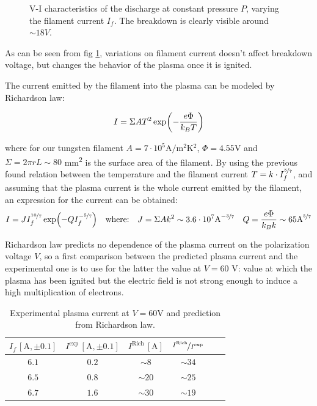 \documentclass[11pt,a4 paper]{article}
\let\oldfrac\frac
\renewcommand{\frac}[3][d]{\ifthenelse{\equal{#1}{d}}{\oldfrac{#2}{#3}}{\nicefrac{#2}{#3}}}
\begin{document}
\begin{figure}[H]
  \centering
  \caption{V-I characteristics of the discharge at constant pressure $P$, varying the filament current $I_f$. The breakdown is clearly visible around $\sim18\si{V}$.}
  \label{fig:constP}
\end{figure}

As can be seen from fig \ref{fig:constP}, variations on filament current doesn't affect breakdown voltage, but changes the behavior of the plasma once it is ignited.

The current emitted by the filament into the plasma can be modeled by Richardson law:

\begin{equation*}
  I = \Sigma A T^2 \exp(-\frac{e\Phi}{k_BT})
\end{equation*}

where for our tungsten filament $A = 7\cdot 10^5 \si{\ampere/\metre^2\kelvin^2}$, $\Phi =  4.55 \si{\volt}$ and $\Sigma = 2\pi r L \sim 80$ \si{\milli\metre^2} is the surface area of the filament. By using the previous found relation between the temperature and the filament current $T = k\cdot I_f^{\frac[f]{5}{7}}$, and assuming that the plasma current is the whole current emitted by the filament, an expression for the current can be obtained:
\begin{gather*}
  I = JI_f^{\frac[f]{10}{7}}\exp(-QI_f^{-\frac[f]{5}{7}}) \quad\text{where:}\quad
  J = \Sigma A k^2 \sim 3.6 \cdot 10^7 \text{A}^{-\frac[f]{3}{7}} \quad
  Q = \frac{e\Phi}{k_Bk} \sim 65 \text{A}^{\frac[f]{5}{7}}
\end{gather*}

Richardson law predicts no dependence of the plasma current on the polarization voltage $V$, so a first comparison between the predicted plasma current and the experimental one is to use for the latter the value at $V = 60$ \si{\volt}: value at which the plasma has been ignited but the electric field is not strong enough to induce a high multiplication of electrons.

\begin{table}[H]
  \centering
  \begin{tabular}{cccccc}
    \toprule
    $I_f\,[\si{\ampere},\pm0.1]$ & $I^{\text{exp}}\,[\si{\ampere},\pm0.1]$ & $I^{\text{Rich}}\,[\si{\ampere}]$  & $\frac[f]{I^{\text{Rich}}}{I^{\text{exp}}}$\\
    \midrule
    $6.1$ & $0.2$ & $\sim8$ & $\sim34$ \\
    $6.5$ & $0.8$ & $\sim20$ & $\sim25$ \\
    $6.7$ & $1.6$ & $\sim30$ & $\sim19$ \\
    \bottomrule
  \end{tabular}
  \caption{Experimental plasma current at $V = 60\si{\volt}$ and prediction from Richardson law.}
  \label{tab:richardson}
\end{table}
\end{document}
